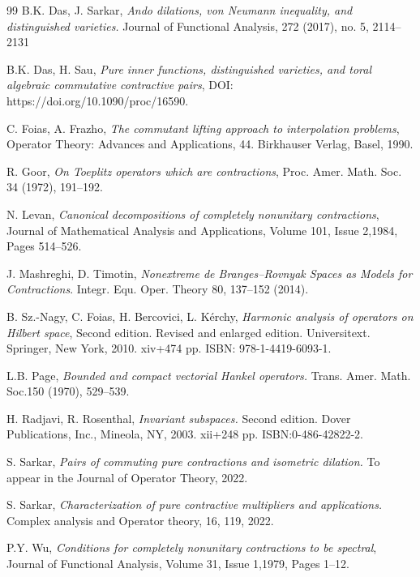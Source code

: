 \documentclass[12pt]{amsart}
\numberwithin{equation}{section}
\theoremstyle{definition}
\newcommand{\D}{\mathbb{D}}
\newcommand{\1}{{\mbox{\bf 1}}}
\begin{document}
\begin{thebibliography}{99}
B.K. Das, J. Sarkar, 
\emph{Ando dilations, von Neumann inequality, and distinguished varieties.} Journal of Functional Analysis, 272 (2017), no. 5, 2114--2131

B.K. Das,  H. Sau,
\emph{Pure inner functions, distinguished varieties, and toral algebraic commutative contractive pairs}, DOI: https://doi.org/10.1090/proc/16590.

C. Foias, A. Frazho, 
\emph{The commutant lifting approach to interpolation problems}, Operator Theory:
Advances and Applications, 44. Birkhauser Verlag, Basel, 1990.

R. Goor, 
\emph{On Toeplitz operators which are contractions}, Proc. Amer. Math. Soc. 34 (1972), 191--192.

N. Levan, 
\emph{Canonical decompositions of completely nonunitary contractions}, Journal of Mathematical Analysis and Applications, Volume 101, Issue 2,1984, Pages 514--526.

J. Mashreghi, D. Timotin, 
\emph{Nonextreme de Branges–Rovnyak Spaces as Models for Contractions}. Integr. Equ. Oper. Theory 80, 137--152 (2014). 


B. Sz.-Nagy, C. Foias, H. Bercovici, L. K\'erchy,
\emph{Harmonic analysis of operators on Hilbert space}, 
Second edition. Revised and enlarged edition. Universitext. Springer, New York, 2010. xiv+474 pp. ISBN: 978-1-4419-6093-1.

L.B. Page, 
\emph{Bounded and compact vectorial Hankel operators.}
Trans. Amer. Math. Soc.150 (1970), 529--539.


H. Radjavi, R.  Rosenthal,
\emph{Invariant subspaces.} Second edition. Dover Publications, Inc., Mineola, NY, 2003. xii+248 pp.
ISBN:0-486-42822-2.

S. Sarkar,
\emph{Pairs of commuting pure contractions and isometric dilation.} To appear in the Journal of Operator Theory, 2022.

S. Sarkar,
\emph{Characterization of pure contractive multipliers and applications.} Complex analysis and Operator theory, 16, 119, 2022.

P.Y. Wu,
\emph{Conditions for completely nonunitary contractions to be spectral}, Journal of Functional Analysis,
Volume 31, Issue 1,1979, Pages 1--12.
\end{thebibliography}
\end{document}
